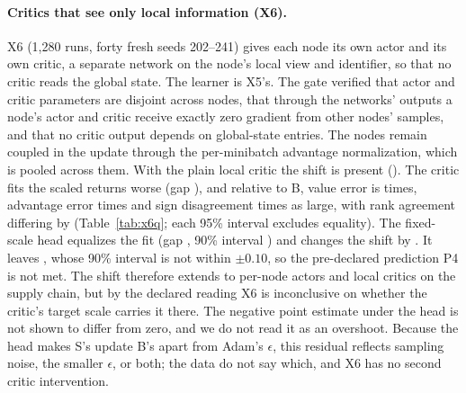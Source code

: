 


\paragraph{Critics that see only local information (X6).}
X6 (1,280 runs, forty fresh seeds 202--241) gives each node its own actor and its own critic, a separate network on the
node's local view and identifier, so that no critic reads the global state. The learner is X5's. The gate verified
that actor and critic parameters are disjoint across nodes, that through the networks' outputs a node's actor and critic
receive exactly zero gradient from other nodes' samples, and that no critic output depends on global-state entries.
The nodes remain coupled in the update through the per-minibatch advantage normalization, which is pooled across them. With the plain local critic the shift
is present (\VxsixPlain{}). The critic fits the scaled returns worse (gap \VxsixFit{}), and relative to B, value error
is \VxsixVerr{} times, advantage error \VxsixGae{} times and sign disagreement \VxsixSign{} times as large, with rank
agreement differing by \VxsixRank{} (Table~\ref{tab:x6q}; each 95\% interval excludes equality). The fixed-scale head
equalizes the fit (gap \VxsixFitHead{}, 90\% interval \VxsixFitHeadNinety{}) and changes the shift by \VxsixChHead{}.
It leaves \VxsixHead{}, whose 90\% interval \VxsixHeadNinety{} is not within $\pm0.10$, so the pre-declared
prediction P4 is not met. The shift therefore extends to per-node actors and local critics on the supply
chain, but by the declared reading X6 is inconclusive on whether the critic's target scale carries it there. The
negative point estimate under the head is not shown to differ from zero, and we do not read it as an overshoot.
Because the head makes S's update B's apart from Adam's $\epsilon$, this residual reflects sampling noise, the smaller
$\epsilon$, or both; the data do not say which, and X6 has no second critic intervention.

